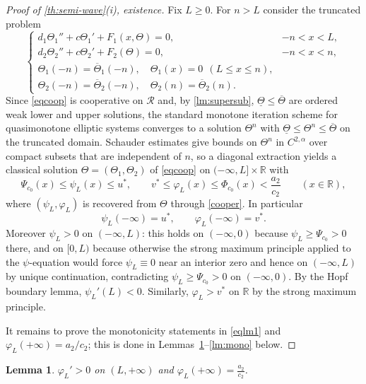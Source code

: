 \documentclass[reqno]{amsart}
\theoremstyle{plain}
\newtheorem{lemma}[theorem]{Lemma}
\theoremstyle{definition}
\theoremstyle{remark}
\begin{document}
\begin{proof}[Proof of \cref{th:semi-wave}(i), existence]
	Fix $L\ge0$. For $n>L$ consider the truncated problem
	\[
	\begin{cases}
		d_1\Theta_1''+c\Theta_1'+F_1(x,\Theta)=0, & -n<x<L,\\
		d_2\Theta_2''+c\Theta_2'+F_2(\Theta)=0, & -n<x<n,\\
		\Theta_1(-n)=\overline\Theta_1(-n),\quad \Theta_1(x)=0\ \ (L\le x\le n),\\
		\Theta_2(-n)=\overline\Theta_2(-n),\quad \Theta_2(n)=\overline\Theta_2(n).
	\end{cases}
	\]
	Since \eqref{eqcoop} is cooperative on $\mathcal R$ and, by
	\cref{lm:supersub}, $\underline\Theta\le\overline\Theta$ are ordered weak
	lower and upper solutions, the standard monotone iteration scheme for
	quasimonotone elliptic systems converges to a solution $\Theta^n$ with
	$\underline\Theta\le\Theta^n\le\overline\Theta$ on the truncated domain.
	Schauder estimates give bounds on $\Theta^n$ in $C^{2,\alpha}$ over compact
	subsets that are independent of $n$, so a diagonal extraction yields a
	classical solution $\Theta=(\Theta_1,\Theta_2)$ of \eqref{eqcoop} on
	$(-\infty,L]\times \mathbb{R}$ with
	\begin{equation}\label{s0}
		\Psi_{c_0}(x) \le \psi_L(x) \le u^*,
		\qquad
		v^* \le \varphi_L(x) \le \Phi_{c_0}(x) < \frac{a_2}{c_2}
		\qquad (x\in \mathbb{R}),
	\end{equation}
	where $(\psi_L,\varphi_L)$ is recovered from $\Theta$ through
	\eqref{cooper}. In particular
	\begin{equation}\label{s1}
		\psi_L(-\infty) = u^*, \qquad \varphi_L(-\infty) = v^* .
	\end{equation}
	Moreover $\psi_L>0$ on $(-\infty,L)$: this holds on $(-\infty,0)$ because
	$\psi_L\ge\Psi_{c_0}>0$ there, and on $[0,L)$ because otherwise the strong
	maximum principle applied to the $\psi$-equation would force $\psi_L\equiv0$
	near an interior zero and hence on $(-\infty,L)$ by unique continuation,
	contradicting $\psi_L\ge\Psi_{c_0}>0$ on $(-\infty,0)$. By the Hopf boundary
	lemma, $\psi_L'(L)<0$. Similarly, $\varphi_L>v^*$ on $\mathbb{R}$ by the strong
	maximum principle.

	It remains to prove the monotonicity statements in \eqref{eqlm1} and
	$\varphi_L(+\infty)=a_2/c_2$; this is done in
	Lemmas~\ref{lm:phi_infty}--\ref{lm:mono} below.
\end{proof}

\begin{lemma}\label{lm:phi_infty}
	$\varphi_L'>0$ on $(L,+\infty)$ and $\varphi_L(+\infty)=\frac{a_2}{c_2}$.
\end{lemma}
\end{document}
